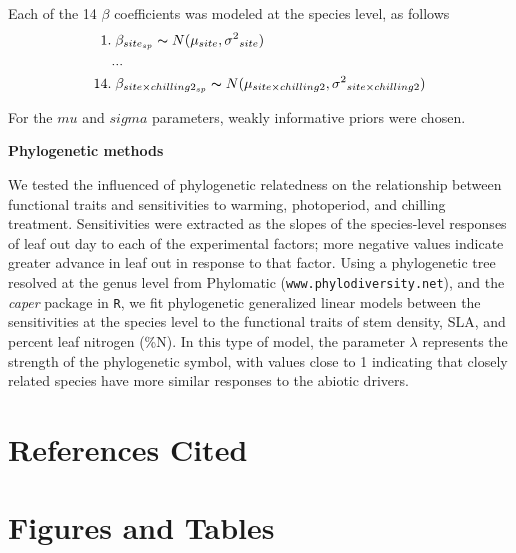 \documentclass[11pt]{article}
\begin{document}
Each of the 14 $\beta$ coefficients was modeled at the species level, as follows
\begin{align*}
1.& \; \beta_{site_{sp}} \thicksim N(\mu_{site}, \sigma{^2}_{site}) \\
   &... \\
14.& \; \beta_{site \times chilling2_{sp}} \thicksim N(\mu_{site \times chilling2}, \sigma{^2}_{site \times chilling2})
\end{align*}

For the $mu$ and $sigma$ parameters, weakly informative priors were chosen.

\textbf{Phylogenetic methods}

We tested the influenced of phylogenetic relatedness on the relationship between functional traits and sensitivities to warming, photoperiod, and chilling treatment. Sensitivities were extracted as the slopes of the species-level responses of leaf out day to each of the experimental factors; more negative values indicate greater advance in leaf out in response to that factor. Using a phylogenetic tree resolved at the genus level from Phylomatic (\texttt{www.phylodiversity.net}), and the \emph{caper} package in \texttt{R}, we fit phylogenetic generalized linear models between the sensitivities at the species level to the functional traits of stem density, SLA, and percent leaf nitrogen (\%N). In this type of model, the parameter $\lambda$ represents the strength of the phylogenetic symbol, with values close to 1 indicating that closely related species have more similar responses to the abiotic drivers.

\section*{References Cited}




\section*{Figures and Tables}

\end{document}
